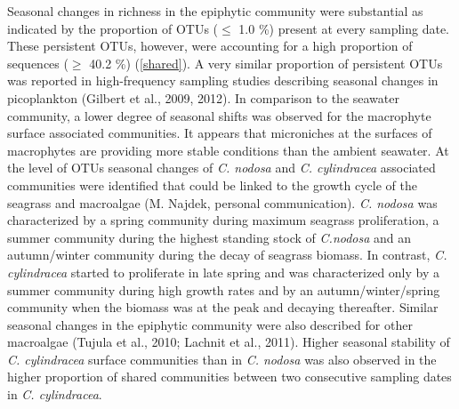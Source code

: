 \documentclass[
  12pt,
]{article}
\begin{document}
Seasonal changes in richness in the epiphytic community were substantial
as indicated by the proportion of OTUs (\(\leq\) 1.0 \si{\percent})
present at every sampling date. These persistent OTUs, however, were
accounting for a high proportion of sequences (\(\geq\) 40.2
\si{\percent}) (\autoref{shared}). A very similar proportion of
persistent OTUs was reported in high-frequency sampling studies
describing seasonal changes in picoplankton (Gilbert et al., 2009,
2012). In comparison to the seawater community, a lower degree of
seasonal shifts was observed for the macrophyte surface associated
communities. It appears that microniches at the surfaces of macrophytes
are providing more stable conditions than the ambient seawater. At the
level of OTUs seasonal changes of \emph{C. nodosa} and \emph{C.
cylindracea} associated communities were identified that could be linked
to the growth cycle of the seagrass and macroalgae (M. Najdek, personal
communication). \emph{C. nodosa} was characterized by a spring community
during maximum seagrass proliferation, a summer community during the
highest standing stock of \emph{C.nodosa} and an autumn/winter community
during the decay of seagrass biomass. In contrast, \emph{C. cylindracea}
started to proliferate in late spring and was characterized only by a
summer community during high growth rates and by an autumn/winter/spring
community when the biomass was at the peak and decaying thereafter.
Similar seasonal changes in the epiphytic community were also described
for other macroalgae (Tujula et al., 2010; Lachnit et al., 2011). Higher
seasonal stability of \emph{C. cylindracea} surface communities than in
\emph{C. nodosa} was also observed in the higher proportion of shared
communities between two consecutive sampling dates in \emph{C.
cylindracea}.
\end{document}
